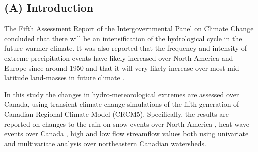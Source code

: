 \documentclass[a0,landscape]{a0poster}
\begin{document}
\vspace{0.1cm} %


\begin{multicols*}{4} %


\color{DarkSlateGray} %

\section*{(A) Introduction}
The Fifth Assessment Report of the Intergovernmental Panel on Climate Change
concluded that there will be an intensification of the hydrological cycle in the
future warmer climate. It was also reported that the frequency and intensity of
extreme precipitation events have likely increased over North America and Europe
since around 1950 \citep{hartmann2013} and that it will very likely increase
over most mid-latitude land-masses in future climate \citep{collins2013}.

In this study the changes in hydro-meteorological extremes are assessed over
Canada, using transient climate change simulations of the fifth generation of
Canadian Regional Climate Model (CRCM5). Specifically, the results are reported
on changes to the rain on snow events over North America \citep{jeong2016ros}, heat wave events over
Canada \citep{jeong2016heatwave}, high and low flow streamflow values \citep{jeong2014copula,huziy2016impact} both using
univariate and multivariate analysis over northeastern Canadian watersheds.




\color{DarkSlateGray} %


\end{multicols*}
\end{document}
